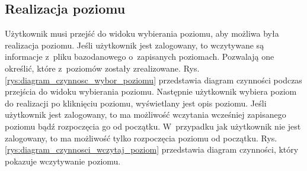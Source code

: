\documentclass[12pt, a4paper]{article} %
\begin{document}
\subsection{Realizacja poziomu}
\aka Użytkownik musi przejść do widoku wybierania poziomu, aby możliwa była realizacja poziomu. Jeśli użytkownik jest zalogowany, to wczytywane są informacje z~pliku bazodanowego o~zapisanych poziomach. Pozwalają one określić, które z~poziomów zostały zrealizowane. Rys. \ref{rys:diagram_czynnosc_wybor_poziomu} przedstawia diagram czynności podczas przejścia do widoku wybierania poziomu. Następnie użytkownik wybiera poziom do realizacji po kliknięciu poziomu, wyświetlany jest opis poziomu. Jeśli użytkownik jest zalogowany, to ma możliwość wczytania wcześniej zapisanego poziomu bądź rozpoczęcia go od początku. W~przypadku jak użytkownik nie jest zalogowany, to ma możliwość tylko rozpoczęcia poziomu od początku. Rys. \ref{rys:diagram_czynnosci_wczytaj_poziom} przedstawia diagram czynności, który pokazuje wczytywanie poziomu.
\end{document}
